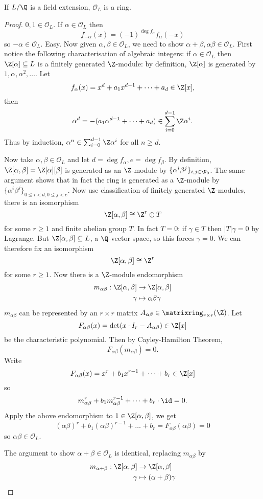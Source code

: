 \documentclass[a4paper]{article}
\renewcommand*{\O}{\mathcal{O}}
\begin{document}
\begin{proposition}
  If \(L/\Q\) is a field extension, \(\O_L\) is a ring.
\end{proposition}

\begin{proof}
  \(0, 1 \in \O_L\). If \(\alpha \in \O_L\) then
  \[
    f_{-\alpha}(x) = (-1)^{\deg f_\alpha} f_\alpha(-x)
  \]
  so \(-\alpha \in \O_L\). Easy. Now given \(\alpha, \beta \in \O_L\), we need to show \(\alpha + \beta, \alpha\beta \in \O_L\). First notice the following characterisation of algebraic integers: if \(\alpha \in \O_L\) then \(\Z[\alpha] \subseteq L\) is a finitely generated \(\Z\)-module: by definition, \(\Z[\alpha]\) is generated by \(1, \alpha, \alpha^2, \dots\). Let
  \[
    f_\alpha(x) = x^d + a_1x^{d - 1} + \dots + a_d \in \Z[x],
  \]
  then
  \[
    \alpha^d = -(a_1\alpha^{d - 1} + \dots + a_d) \in \sum_{i = 0}^{d - 1} \Z \alpha^i.
  \]
  Thus by induction, \(\alpha^n \in \sum_{i = 0}^{d - 1}\Z \alpha^i\) for all \(n \geq d\).

  Now take \(\alpha, \beta \in \O_L\) and let \(d = \deg f_\alpha, e = \deg f_\beta\). By definition, \(\Z[\alpha, \beta] = \Z[\alpha][\beta]\) is generated as an \(\Z\)-module by \(\{\alpha^i\beta^j\}_{i, j \in \N_0}\). The same argument shows that in fact the ring is generated as a \(\Z\)-module by \(\{\alpha^i\beta^j\}_{0 \leq i < d, 0 \leq j < e}\). Now use classification of finitely generated \(\Z\)-modules, there is an isomorphism
  \[
    \Z[\alpha, \beta] \cong \Z^r \oplus T
  \]
  for some \(r \geq 1\) and finite abelian group \(T\). In fact \(T = 0\): if \(\gamma \in T\) then \(|T|\gamma = 0\) by Lagrange. But \(\Z[\alpha, \beta] \subseteq L\), a \(\Q\)-vector space, so this forces \(\gamma = 0\). We can therefore fix an isomorphism
  \[
    \Z[\alpha, \beta] \cong \Z^r
  \]
  for some \(r \geq 1\). Now there is a \(\Z\)-module endomorphism
  \begin{align}
    m_{\alpha\beta}: \Z[\alpha, \beta] &\to \Z[\alpha, \beta] \\
    \gamma &\mapsto \alpha\beta\gamma
  \end{align}
  \(m_{\alpha\beta}\) can be represented by an \(r \times r\) matrix \(A_{\alpha\beta} \in \matrixring_{r \times r}(\Z)\). Let
  \[
    F_{\alpha\beta}(x) = \det(x \cdot I_r - A_{\alpha\beta}) \in \Z[x]
  \]
  be the characteristic polynomial. Then by Cayley-Hamilton Theorem,
  \[
    F_{\alpha\beta}(m_{\alpha\beta}) = 0.
  \]
  Write
  \[
    F_{\alpha\beta}(x) = x^r + b_1x^{r - 1} + \dots + b_r \in \Z[x]
  \]
  so
  \[
    m_{\alpha\beta}^r + b_1m_{\alpha\beta}^{r - 1} + \dots + b_r \cdot \id = 0.
  \]
  Apply the above endomorphism to \(1 \in \Z[\alpha, \beta]\), we get
  \[
    (\alpha\beta)^r + b_1(\alpha\beta)^{r - 1} + \dots + b_r = F_{\alpha\beta}(\alpha\beta) = 0
  \]
  so \(\alpha\beta \in \O_L\).

  The argument to show \(\alpha + \beta \in \O_L\) is identical, replacing \(m_{\alpha\beta}\) by
  \begin{align*}
    m_{\alpha + \beta}: \Z[\alpha, \beta] &\to \Z[\alpha, \beta] \\
    \gamma &\mapsto (\alpha + \beta)\gamma
  \end{align*}
\end{proof}
\end{document}
